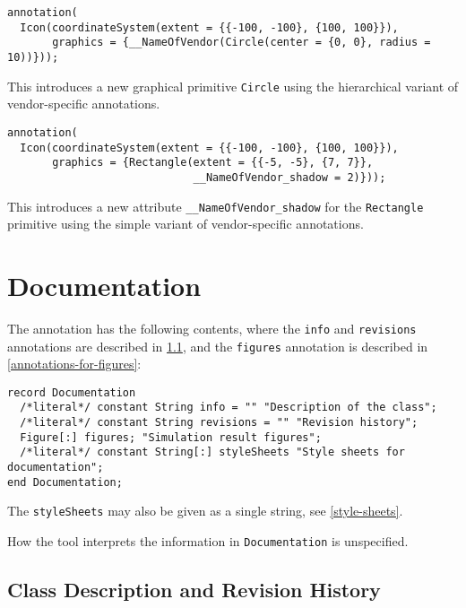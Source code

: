 \begin{example}
\begin{lstlisting}[language=modelica]
annotation(
  Icon(coordinateSystem(extent = {{-100, -100}, {100, 100}}),
       graphics = {__NameOfVendor(Circle(center = {0, 0}, radius = 10))}));
\end{lstlisting}
This introduces a new graphical primitive \lstinline!Circle! using the hierarchical variant of vendor-specific annotations.
\begin{lstlisting}[language=modelica]
annotation(
  Icon(coordinateSystem(extent = {{-100, -100}, {100, 100}}),
       graphics = {Rectangle(extent = {{-5, -5}, {7, 7}},
                             __NameOfVendor_shadow = 2)}));
\end{lstlisting}
This introduces a new attribute \lstinline!__NameOfVendor_shadow! for the \lstinline!Rectangle! primitive using the simple variant of vendor-specific annotations.
\end{example}


\section{Documentation}\label{annotations-for-documentation}\label{documentation}

The  annotation has the following contents, where the \lstinline!info! and \lstinline!revisions! annotations are described in \cref{annotation-info-revisions}, and the \lstinline!figures! annotation is described in \cref{annotations-for-figures}:
\begin{lstlisting}[language=modelica]
record Documentation
  /*literal*/ constant String info = "" "Description of the class";
  /*literal*/ constant String revisions = "" "Revision history";
  Figure[:] figures; "Simulation result figures";
  /*literal*/ constant String[:] styleSheets "Style sheets for documentation";
end Documentation;
\end{lstlisting}

The \lstinline!styleSheets! may also be given as a single string, see \cref{style-sheets}.

How the tool interprets the information in \lstinline!Documentation! is unspecified.

\subsection{Class Description and Revision History}\label{annotation-info-revisions}

